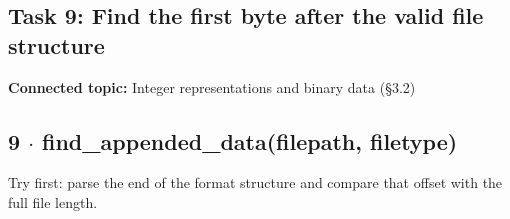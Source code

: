 \documentclass[11pt]{article}
\begin{document}
\begin{keepsection}
\section{Task 9: Find the first byte after the valid file structure}

\textbf{Connected topic:} Integer representations and binary data (§3.2)

\begin{keepsection}
\subsection{9 \ensuremath{\cdot} find\_appended\_data(filepath, filetype)}

Try first: parse the end of the format structure and compare that offset with the full file length.

\end{keepsection}
\end{keepsection}
\end{document}

